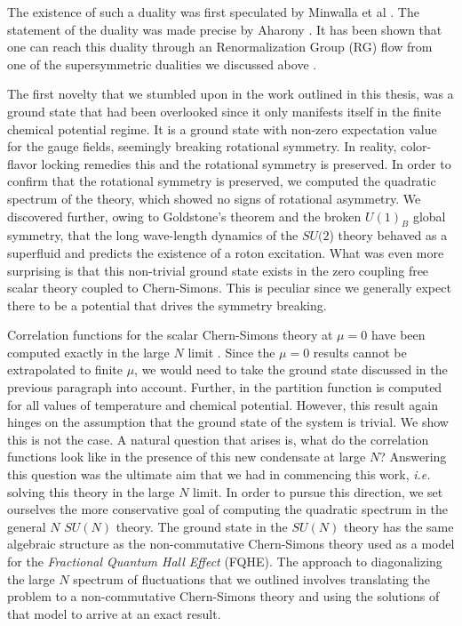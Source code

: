 The existence of such a duality was first speculated by Minwalla et al \cite{Giombi:2011kc}. The statement of the duality was made precise by Aharony \cite{Aharony:2015mjs}.  It has been shown that one can reach this duality through an Renormalization Group (RG) flow from one of the supersymmetric dualities we discussed above \cite{Gur-Ari:2015pca}.


The first novelty that we stumbled upon in the work outlined in this thesis, was a ground state that had been overlooked since it only manifests itself in the finite chemical potential regime. It is a ground state with non-zero expectation value for the gauge fields, seemingly breaking rotational symmetry. In reality, color-flavor locking remedies this and the rotational symmetry is preserved. In order to confirm that the rotational symmetry is preserved, we computed the quadratic spectrum of the theory, which showed no signs of rotational asymmetry. We discovered further, owing to Goldstone's theorem and the broken $U(1)_B$ global symmetry, that the long wave-length dynamics of the $SU(2$) theory behaved as a superfluid and predicts the existence of a roton excitation. What was even more surprising is that this non-trivial ground state exists in the zero coupling free scalar theory coupled to Chern-Simons. This is peculiar since we generally expect there to be a potential that drives the symmetry breaking.

Correlation functions for the scalar Chern-Simons theory at $\mu=0$ have been computed exactly in the large $N$ limit \cite{Aharony:2012nh}. Since the $\mu =0$ results cannot be extrapolated to finite $\mu$, we would need to take the ground state discussed in the previous paragraph into account. Further, in \cite{Jain:2013gza} the partition function is computed for all values of temperature and chemical potential. However, this result again hinges on the assumption that the ground state of the system is trivial. We show this is not the case. A natural question that arises is, what do the correlation functions look like in the presence of this new condensate at large $N$? Answering this question was the ultimate aim that we had in commencing this work, \textit{i.e.} solving this theory in the large $N$ limit. In order to pursue this direction, we set ourselves the more conservative goal of computing the quadratic spectrum in the general $N$ $SU(N)$ theory. The ground state in the $SU(N)$ theory has the same algebraic structure as the non-commutative Chern-Simons theory used as a model for the \textit{Fractional Quantum Hall Effect} (FQHE). The approach to diagonalizing the large $N$ spectrum of fluctuations that we outlined involves translating the problem to a non-commutative Chern-Simons theory and using the solutions of that model to arrive at an exact result.


